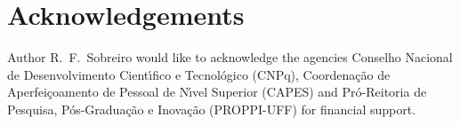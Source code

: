 \documentclass[../main.tex]{subfiles}
\begin{document}
\section*{Acknowledgements}
Author R.~F.~Sobreiro would like to acknowledge the agencies Conselho Nacional de Desenvolvimento Cient{\'{\i}}fico e Tecnol{\'{o}}gico (CNPq), Coordena{\c{c}}{\~{a}}o de Aperfei{\c{c}}oamento de Pessoal de N{\'{\i}}vel Superior (CAPES) and Pr{\'{o}}-Reitoria de Pesquisa, P{\'{o}}s-Gradua{\c{c}}{\~{a}}o e Inova{\c{c}}{\~{a}}o (PROPPI-UFF) for financial support.
\end{document}
